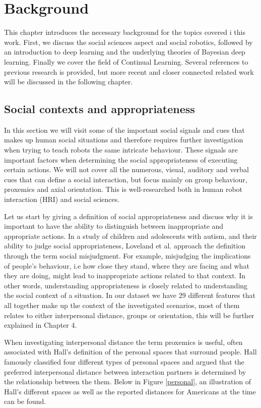 \documentclass[a4paper,12pt]{report}
\begin{document}
\chapter{Background}
This chapter introduces the necessary background for the topics covered i this work. First, we discuss the social sciences aspect and social robotics, followed by an introduction to deep learning and the underlying theories of Bayesian deep learning. Finally we cover the field of Continual Learning. Several references to previous research is provided, but more recent and closer connected related work will be discussed in the following chapter.

\section{Social contexts and appropriateness}
In this section we will visit some of the important social signals and cues that makes up human social situations and therefore requires further investigation when trying to teach robots the same intricate behaviour. These signals are important factors when determining the social appropriateness of executing certain actions. We will not cover all the numerous, visual, auditory and verbal cues that can define a social interaction, but focus mainly on group behaviour, proxemics and axial orientation. This is well-researched both in human robot interaction (HRI)  and social sciences.  

Let us start by giving a definition of social appropriateness and discuss why it is important to have the ability to distinguish between inappropriate and appropriate actions. In a study of children and adolescents with autism, and their ability to judge social appropriateness, Loveland et al. \cite{loveland2001judgments} approach the definition through the term social misjudgment. For example, misjudging the implications of people's behaviour, i.e how close they stand, where they are facing and what they are doing, might lead to inappropriate actions related to that context. In other words, understanding appropriateness is closely related to understanding the social context of a situation. In our dataset we have 29 different features that all together make up the context of the investigated scenarios, most of them relates to either interpersonal distance, groups or orientation, this will be further explained in Chapter 4.

When investigating interpersonal distance the term proxemics is useful, often associated with Hall's \cite{hall1968proxemics} definition of the personal spaces that surround people. Hall famously classified four different types of personal spaces and argued that the preferred interpersonal distance between interaction partners is determined by the relationship between the them. Below in Figure \ref{personal}, an illustration of Hall's different spaces as well as the reported distances for Americans at the time can be found.
\end{document}

